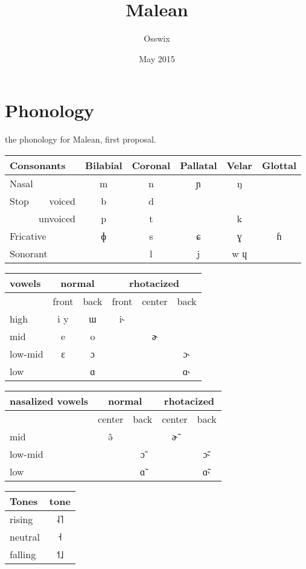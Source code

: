 \documentclass{article}
\title{Malean}
\author{Osswix}
\date{May 2015}
\begin{document}
\maketitle

\tableofcontents


\pagebreak

\section{Phonology}
the phonology for Malean, first proposal.

\begin{tabular}{|lr|c|c|c|c|c|}
\hline
\multicolumn{2}{|l|}{Consonants} & Bilabial & Coronal & Pallatal & Velar & Glottal \\
\hline
\hline
\multicolumn{2}{|l|}{Nasal} & m & n & ɲ & ŋ &\\
Stop & voiced & b & d &&&\\
&unvoiced&p&t&&k&\\
\multicolumn{2}{|l|}{Fricative} & ɸ & s & ɕ & ɣ & ɦ\\
\multicolumn{2}{|l|}{Sonorant} & & l & j & w ɥ &\\
\hline
\end{tabular}

\begin{tabular}{|l|cc|ccc|}
\hline
vowels & \multicolumn{2}{|c|}{normal} & \multicolumn{3}{|c|}{rhotacized}\\
\hline
\hline
& front  & back & front & center & back\\
\hline
high& i y & ɯ & i˞ & & \\
mid& e & o && ɚ & \\
low-mid& ɛ & ɔ &&&ɔ˞\\
low& & ɑ &&& ɑ˞\\
\hline
\end{tabular}

\begin{tabular}{|l|cc|cc|}
\hline
nasalized vowels & \multicolumn{2}{|c|}{normal} & \multicolumn{2}{|c|}{rhotacized}\\
\hline
\hline
& center  & back & center & back\\
\hline
mid&ə̃&&ɚ̃&\\
low-mid&&ɔ̃&&ɔ̃˞\\
low&&ɑ̃&&ɑ̃˞\\
\hline
\end{tabular}

\begin{tabular}{|l|c|}
\hline
Tones & tone\\
\hline
\hline
rising& ˨˥ \\
neutral& ˧ \\
falling& ˦˩ \\
\hline
\end{tabular}
\end{document}
